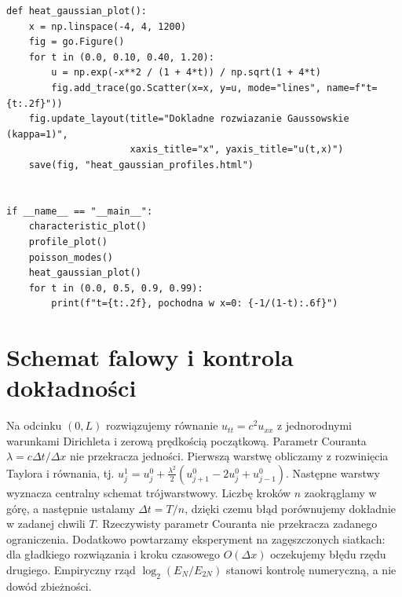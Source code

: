 \begin{lstlisting}[style=pythonpde,caption={Burgers, funkcje harmoniczne i dyfuzja: Plotly},label={code:pde-old}]
def heat_gaussian_plot():
    x = np.linspace(-4, 4, 1200)
    fig = go.Figure()
    for t in (0.0, 0.10, 0.40, 1.20):
        u = np.exp(-x**2 / (1 + 4*t)) / np.sqrt(1 + 4*t)
        fig.add_trace(go.Scatter(x=x, y=u, mode="lines", name=f"t={t:.2f}"))
    fig.update_layout(title="Dokladne rozwiazanie Gaussowskie (kappa=1)",
                      xaxis_title="x", yaxis_title="u(t,x)")
    save(fig, "heat_gaussian_profiles.html")


if __name__ == "__main__":
    characteristic_plot()
    profile_plot()
    poisson_modes()
    heat_gaussian_plot()
    for t in (0.0, 0.5, 0.9, 0.99):
        print(f"t={t:.2f}, pochodna w x=0: {-1/(1-t):.6f}")
\end{lstlisting}

\section{Schemat falowy i kontrola dokładności}
Na odcinku $(0,L)$ rozwiązujemy równanie $u_{tt}=c^2u_{xx}$
z jednorodnymi warunkami Dirichleta i zerową prędkością
początkową. Parametr Couranta $\lambda=c\Delta t/\Delta x$
nie przekracza jedności. Pierwszą warstwę obliczamy
z rozwinięcia Taylora i równania, tj.
$u_j^1=u_j^0+\frac{\lambda^2}{2}(u_{j+1}^0-2u_j^0+u_{j-1}^0)$.
Następne warstwy wyznacza centralny schemat trójwarstwowy.
Liczbę kroków $n$ zaokrąglamy w górę, a następnie
ustalamy $\Delta t=T/n$, dzięki czemu błąd porównujemy
dokładnie w zadanej chwili $T$. Rzeczywisty parametr
Couranta nie przekracza zadanego ograniczenia.
Dodatkowo powtarzamy eksperyment na zagęszczonych siatkach:
dla gładkiego rozwiązania i kroku czasowego $O(\Delta x)$
oczekujemy błędu rzędu drugiego. Empiryczny rząd
$\log_2(E_N/E_{2N})$ stanowi kontrolę numeryczną,
a nie dowód zbieżności.
